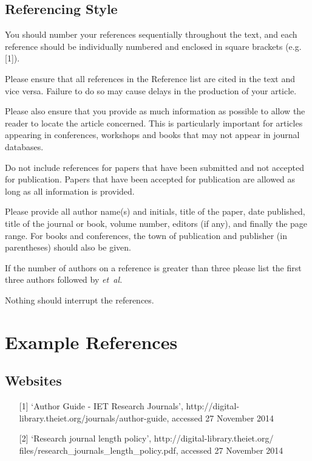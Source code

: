 \documentclass{cta-author}
\begin{document}
\subsection{Referencing Style}\label{subsec12.1}

You should number your references sequentially throughout the text, and each
reference should be individually numbered and enclosed in square brackets
(e.g. [1]).

Please ensure that all references in the Reference list are cited in the
text and vice versa. Failure to do so may cause delays in the production of
your article.

Please also ensure that you provide as much information as possible to allow
the reader to locate the article concerned. This is particularly important
for articles appearing in conferences, workshops and books that may not
appear in journal databases.

Do not include references for papers that have been submitted and not
accepted for publication. Papers that have been accepted for publication are
allowed as long as all information is provided.

Please provide all author name(s) and initials, title of the paper, date
published, title of the journal or book, volume number, editors (if any),
and finally the page range. For books and conferences, the town of
publication and publisher (in parentheses) should also be given.

If the number of authors on a reference is greater than three please list
the first three authors followed by \textit{et~al. }

Nothing should interrupt the references.

\section{Example References}\label{sec13}

\subsection{Websites}\label{subsec13.1}

\begin{enumerate}
\item[{[1]}] `Author Guide - IET Research Journals',
http://digital-library.theiet.org/journals/author-guide, accessed 27
November 2014\vspace*{6pt}

\item[{[2]}] `Research journal length policy',
http://digital-library.theiet.org/ files/research\_journals\_length\_policy.pdf,
accessed 27 November 2014
\end{enumerate}
\end{document}

